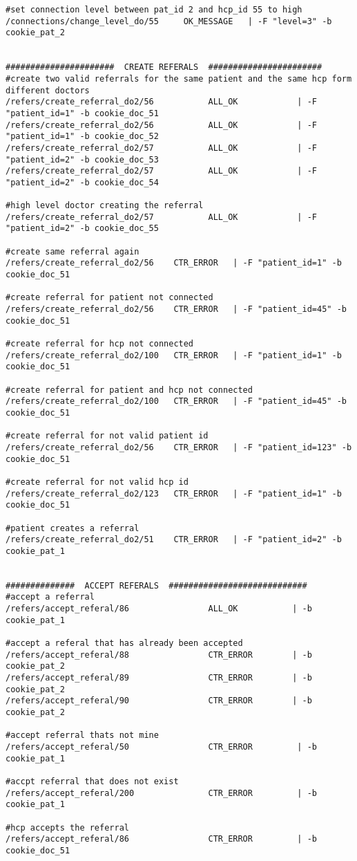 \begin{verbatim}
#set connection level between pat_id 2 and hcp_id 55 to high
/connections/change_level_do/55     OK_MESSAGE   | -F "level=3" -b cookie_pat_2


######################  CREATE REFERALS  #######################
#create two valid referrals for the same patient and the same hcp form different doctors
/refers/create_referral_do2/56           ALL_OK		       | -F "patient_id=1" -b cookie_doc_51
/refers/create_referral_do2/56           ALL_OK		       | -F "patient_id=1" -b cookie_doc_52
/refers/create_referral_do2/57           ALL_OK			   | -F "patient_id=2" -b cookie_doc_53
/refers/create_referral_do2/57           ALL_OK		       | -F "patient_id=2" -b cookie_doc_54

#high level doctor creating the referral
/refers/create_referral_do2/57           ALL_OK		       | -F "patient_id=2" -b cookie_doc_55

#create same referral again
/refers/create_referral_do2/56    CTR_ERROR   | -F "patient_id=1" -b cookie_doc_51

#create referral for patient not connected
/refers/create_referral_do2/56    CTR_ERROR   | -F "patient_id=45" -b cookie_doc_51

#create referral for hcp not connected
/refers/create_referral_do2/100   CTR_ERROR   | -F "patient_id=1" -b cookie_doc_51

#create referral for patient and hcp not connected
/refers/create_referral_do2/100   CTR_ERROR   | -F "patient_id=45" -b cookie_doc_51

#create referral for not valid patient id
/refers/create_referral_do2/56    CTR_ERROR   | -F "patient_id=123" -b cookie_doc_51

#create referral for not valid hcp id
/refers/create_referral_do2/123   CTR_ERROR   | -F "patient_id=1" -b cookie_doc_51

#patient creates a referral
/refers/create_referral_do2/51    CTR_ERROR   | -F "patient_id=2" -b cookie_pat_1


##############  ACCEPT REFERALS  ############################
#accept a referral
/refers/accept_referal/86                ALL_OK		      | -b cookie_pat_1

#accept a referal that has already been accepted
/refers/accept_referal/88                CTR_ERROR        | -b cookie_pat_2
/refers/accept_referal/89                CTR_ERROR        | -b cookie_pat_2
/refers/accept_referal/90                CTR_ERROR        | -b cookie_pat_2

#accept referral thats not mine
/refers/accept_referal/50                CTR_ERROR         | -b cookie_pat_1

#accpt referral that does not exist
/refers/accept_referal/200               CTR_ERROR         | -b cookie_pat_1

#hcp accepts the referral
/refers/accept_referal/86                CTR_ERROR         | -b cookie_doc_51
\end{verbatim}





